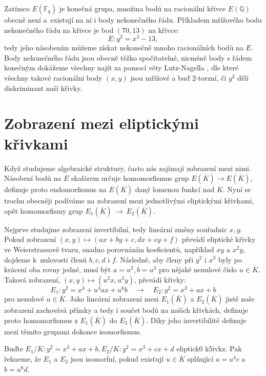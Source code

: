 \documentclass[12pt]{report}
\begin{document}
Zatímco $E(\mathbb{F}_q)$ je konečná grupa, množina bodů na racionální křivce $E(\mathbb{Q})$ obecně není a~existují na ní i body nekonečného řádu. Příkladem mřížového bodu nekonečného řádu na křivce je bod $(70,13)$ na křivce:
\begin{equation*}
E : y^2 = x^3 - 13,
\end{equation*}
tedy jeho násobením můžeme získat nekonečně mnoho racionálních bodů na $E$. Body nekonečného řádu jsou obecně těžko spočitatelné, nicméně body s řádem konečným dokážeme všechny najít za pomocí věty Lutz-Nagella \cite[Thm. 8.7]{Washington}, dle které všechny takové racionální body $(x,y)$ jsou mřížové a buď $2$-torzní, či $y^2$ dělí diskriminant naší křivky.

\section{Zobrazení mezi eliptickými křivkami}

Když studujeme algebraické struktury, často nás zajímají zobrazení mezi nimi. Násobení bodů na $E$ skalárem určuje homomorfismus grup $E(\overline{K}) \longrightarrow E(\overline{K})$, definuje proto endomorfismus na $E(\overline{K})$ daný lomenou funkcí nad $K$. Nyní se trochu obecněji podíváme na zobrazení mezi jednotlivými eliptickými křivkami, opět homomorfismy grup $E_1(\overline{K})~\longrightarrow~E_2(\overline{K})$.

Nejprve studujme zobrazení invertibilní, tedy lineární změny souřadnic $x,y$. Pokud zobrazení $(x,y) \mapsto (ax+by+c,dx+ey+f)$ převádí eliptické křivky ve Weierstrassově tvaru, snadno porovnáním koeficientů, například $xy$ a $x^2 y$, dojdeme k~nulovosti členů $b,c,d$ i $f$. Následně, aby členy při $y^2$ i $x^3$ byly po krácení oba rovny jedné, musí být $a = u^2, b = u^3$ pro nějaké nenulové číslo $u \in \overline{K}$. Taková zobrazení, $(x,y) \mapsto (u^2 x, u^3 y)$, převádí křivky:
\begin{equation*}
E_1 : y^2 = x^3 + u^4 a x + u^6 b \quad \longrightarrow \quad E_2 :  y^2 = x^3 + ax + b 
\end{equation*}
pro nenulové $u \in \overline{K}$. Jako lineární zobrazení mezi $E_1(\overline{K})$ a $E_2(\overline{K})$ jistě naše zobrazení zachovává přímky a tedy i součet bodů na našich křivkách, definuje proto homomorfismus z $E_1(\overline{K})$ do $E_2(\overline{K})$. Díky jeho invertibilitě definuje mezi těmito grupami dokonce isomorfismus.

\begin{definice}
Buďte $E_1/K : y^2 = x^3 + ax + b, E_2/K : y^2 = x^3 + cx + d$ eliptick0 k5ivkz. Pak řekneme, že $E_1$ a $E_2$ jsou isomorfní, pokud existují $u \in \overline{K}$ splňující $a = u^4 c$ a $b = u^6 d$.
\end{definice}
\end{document}
